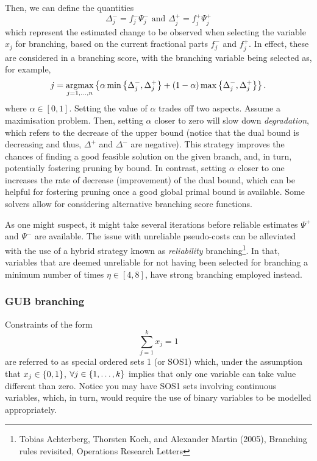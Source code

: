 Then, we can define the quantities
%
\begin{equation} \label{p1c11:eq:improvement_estimates}
	\Delta^-_j = f^-_j \Psi^-_j \text{ and } \Delta^+_j = f^+_j \Psi^+_j
\end{equation}
%
which represent the estimated change to be observed when selecting the variable $x_j$ for branching, based on the current fractional parts $f^-_j$ and $f^+_j$. In effect, these are considered in a branching score, with the branching variable being selected as, for example, 
%
\begin{equation*}
	j = \mathop{\rm argmax}_{j=1, \dots, n} \left\{  \alpha \min\left\{ \Delta^-_j, \Delta^+_j \right \} + (1-\alpha)\max\left\{ \Delta^-_j, \Delta^+_j \right \} \right \}.
\end{equation*}
%
where $\alpha \in [0,1]$. Setting the value of $\alpha$ trades off two aspects. Assume a maximisation problem. Then, setting $\alpha$ closer to zero will slow down \emph{degradation}, which refers to the decrease of the upper bound (notice that the dual bound is decreasing and thus, $\Delta^+$ and $\Delta^-$ are negative). This strategy improves the chances of finding a good feasible solution on the given branch, and, in turn, potentially fostering pruning by bound. In contrast, setting $\alpha$ closer to one increases the rate of decrease (improvement) of the dual bound, which can be helpful for fostering pruning once a good global primal bound is available. Some solvers allow for considering alternative branching score functions. %

As one might suspect, it might take several iterations before reliable estimates $\Psi^+$ and $\Psi^-$ are available. The issue with unreliable pseudo-costs can be alleviated with the use of a hybrid strategy known as \emph{reliability} branching\footnote{Tobias Achterberg, Thorsten Koch, and Alexander Martin (2005), Branching rules revisited, Operations Research Letters}. In that, variables that are deemed unreliable for not having been selected for branching a minimum number of times $\eta \in [4,8]$, have strong branching employed instead.   

 
\subsubsection{GUB branching}
 
Constraints of the form 
%
\begin{equation*}
	\sum_{j = 1}^k x_j = 1	
\end{equation*}
%
are referred to as special ordered sets 1 (or SOS1) which, under the assumption that $x_j \in \left\{ 0,1 \right \}$, $\forall j \in \left\{ 1,\dots,k \right \}$ implies that only one variable can take value different than zero. Notice you may have SOS1 sets involving continuous variables, which, in turn, would require the use of binary variables to be modelled appropriately. 

